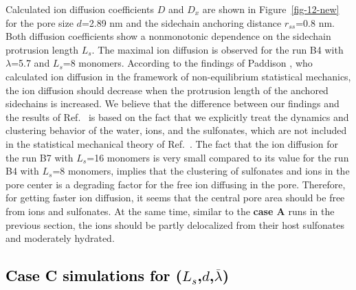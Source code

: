\documentclass[3p,english,preprint]{elsarticle}
\newcommand{\mod}[1]{\textcolor{black}{#1}}
\begin{document}
Calculated ion diffusion coefficients $D$ and $D_x$ are shown in  Figure~\ref{fig-12-new}
 for the pore size $d$=2.89 nm and the sidechain anchoring distance $r_{ss}$=0.8 nm.
Both diffusion coefficients  show a nonmonotonic dependence on the sidechain 
 protrusion length $L_s$.
The maximal ion diffusion is observed for the run B4 
with $\lambda$=5.7 and $L_s$=8 monomers. 
According to the findings of Paddison 
 \cite{paddison-2003-review}, who calculated  ion diffusion in the 
framework of non-equilibrium statistical mechanics, 
the ion diffusion should decrease when the 
protrusion length of the anchored sidechains is increased. 
We believe that the difference between our findings  and the results of
 Ref.~\cite{paddison-2003-review} is based on the fact that we 
explicitly treat the dynamics and clustering behavior of the water, ions, and the sulfonates,
which are not included in the statistical mechanical theory of
Ref.~\cite{paddison-2003-review}. 
The fact that the ion diffusion for the run B7 
with $L_s$=16 monomers is very small compared to its value 
for the run B4 with $L_s$=8 monomers, implies that the clustering of sulfonates
 and ions in the pore center 
is a degrading factor for the free ion diffusing in the pore. 
Therefore, for getting faster ion diffusion, it seems that the 
central pore area should be free from ions and sulfonates. 
At the same time, similar to the {\bf case A} runs in the previous section, 
the ions should be partly delocalized from their host sulfonates and 
moderately hydrated.
 























{\mod{ 
\subsection{Case C simulations for ($L_s$,$d$,$\overline{\lambda}$)}
}}
\end{document}
